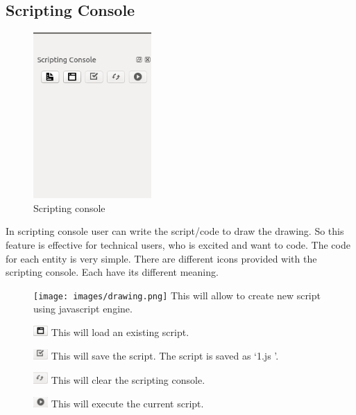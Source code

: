 \subsection{Scripting Console}
\begin{figure}[h!]
\centering
\includegraphics[width=0.4\textwidth]{images/scriptingconsole.png} 
\caption{Scripting console}
\end{figure}
In scripting console user can write the script/code to draw the drawing. So this feature is effective for technical users, who is excited and want to code. The code for each entity is very simple. There are different icons provided with the scripting console. Each have its different meaning.
\begin{figure}[h!]
\texttt{[image: images/drawing.png]} 
This will allow to create new script using javascript engine.
\end{figure}
\begin{figure}[h!]
\includegraphics[width=0.05\textwidth]{images/browser.png} 
This will load an existing script.
\end{figure}
\begin{figure}[h!]
\includegraphics[width=0.05\textwidth]{images/task.png} 
This will save the script. The script is saved as \lq 1.js \rq.
\end{figure}
\begin{figure}[h!]
\includegraphics[width=0.05\textwidth]{images/loop-circular.png} 
This will clear the scripting console.
\end{figure}
\begin{figure}[h!]
\includegraphics[width=0.05\textwidth]{images/play-circular.png} 
This will execute the current script.
\end{figure}
\newpage
